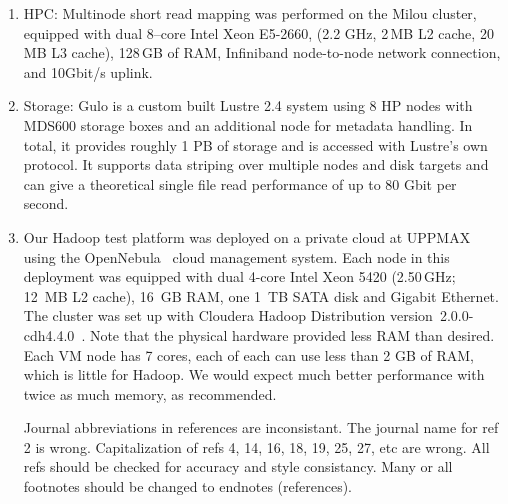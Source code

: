 \documentclass[11pt, oneside]{article}   	%
\newcommand{\COMMENT}[1]{{\color{red} #1 }}
\begin{document}
\begin{enumerate}

\item 
HPC:
Multinode short read mapping was performed on the Milou cluster\cite{milouCluster}, equipped with dual 8--core Intel Xeon E5-2660, (2.2 GHz, 2\,MB L2 cache, 20\,MB L3 cache), 128\,GB of RAM, Infiniband node-to-node network connection, and 10Gbit/s uplink.

\item Storage: 
Gulo\cite{gulo} is a custom built Lustre 2.4 system using 8 HP nodes with MDS600 storage boxes and an additional node for metadata handling. In total, it provides roughly 1 PB of storage and is accessed with Lustre's own protocol. It supports data striping over multiple nodes and disk targets and can give a theoretical single file read performance of up to 80 Gbit per second.

\item Our Hadoop test platform was deployed on a private cloud at UPPMAX using the OpenNebula~\cite{opennebula} cloud management system. Each node in this deployment was equipped with dual 4-core Intel Xeon 5420 (2.50\,GHz; 12~MB L2 cache), 16~GB RAM, one 1~TB SATA disk and Gigabit Ethernet. The cluster was set up with Cloudera Hadoop Distribution version~2.0.0-cdh4.4.0~\cite{cloudera}.
Note that the physical hardware provided less RAM than desired. Each VM node has 7 cores, each of each can use less than 2 GB of RAM, which is little for Hadoop. We would expect much better performance with twice as much memory, as recommended.

\COMMENT{Journal abbreviations in references are inconsistant. The journal name for ref 2 is wrong. Capitalization of refs 4, 14, 16, 18, 19, 25, 27, etc are wrong. All refs should be checked for accuracy and style consistancy. Many or all footnotes should be changed to endnotes (references).}

\end{enumerate}



\end{document}
